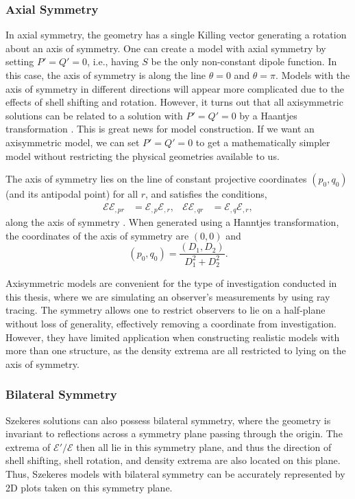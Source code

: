 \documentclass[a4paper,12pt]{report}
\begin{document}
\subsubsection{Axial Symmetry}
In axial symmetry, the geometry has a single Killing vector generating a rotation about an axis of symmetry. One can create a model with axial symmetry by setting $P'=Q'=0$, i.e., having $S$ be the only non-constant dipole function. In this case, the axis of symmetry is along the line $\theta=0$ and $\theta = \pi$. Models with the axis of symmetry in different directions will appear more complicated due to the effects of shell shifting and rotation. However, it turns out that all axisymmetric solutions can be related to a solution with $P'=Q'=0$ by a Haantjes transformation \cite{RN8}. This is great news for model construction. If we want an axisymmetric model, we can set $P'=Q'=0$ to get a mathematically simpler model without restricting the physical geometries available to us.

The axis of symmetry lies on the line of constant projective coordinates $(p_0,q_0)$ (and its antipodal point) for all $r$, and satisfies the conditions,
\begin{align}
  \mathcal{E}\mathcal{E}_{,pr} &= \mathcal{E}_{,p} \mathcal{E}_{,r}, & \mathcal{E}\mathcal{E}_{,qr} &= \mathcal{E}_{,q} \mathcal{E}_{,r},
\end{align}
along the axis of symmetry \cite{RN8,RN4,RN1}. When generated using a Hanntjes transformation, the coordinates of the axis of symmetry are $(0,0)$ and
\begin{equation}
    (p_0, q_0) = \frac{(D_1, D_2)}{D_1^2 + D_2^2}.
\end{equation}

Axisymmetric models are convenient for the type of investigation conducted in this thesis, where we are simulating an observer's measurements by using ray tracing. The symmetry allows one to restrict observers to lie on a half-plane without loss of generality, effectively removing a coordinate from investigation. However, they have limited application when constructing realistic models with more than one structure, as the density extrema are all restricted to lying on the axis of symmetry.

\subsubsection{Bilateral Symmetry}
Szekeres solutions can also possess bilateral symmetry, where the geometry is invariant to reflections across a symmetry plane passing through the origin. The extrema of $\mathcal{E}'/\mathcal{E}$ then all lie in this symmetry plane, and thus the direction of shell shifting, shell rotation, and density extrema are also located on this plane. Thus, Szekeres models with bilateral symmetry can be accurately represented by 2D plots taken on this symmetry plane.
\end{document}
